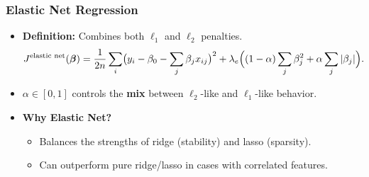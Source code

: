\documentclass[aspectratio=169]{beamer}
\begin{document}
\begin{frame}
    \frametitle{Elastic Net Regression}
    \begin{itemize}
        \item \textbf{Definition:} Combines both \(\ell_1\) and \(\ell_2\) penalties.
        \[
            J^{\text{elastic net}}(\boldsymbol{\beta}) 
            = \frac{1}{2n}\sum_i\bigl(y_i - \beta_0 - \sum_j\beta_j x_{ij}\bigr)^2 
            + \lambda_e \Bigl((1-\alpha)\sum_j \beta_j^2 + \alpha \sum_j|\beta_j|\Bigr).
        \]
        \item \(\alpha \in [0,1]\) controls the \textbf{mix} between \(\ell_2\)-like and \(\ell_1\)-like behavior.
        \item \textbf{Why Elastic Net?}
        \begin{itemize}
            \item Balances the strengths of ridge (stability) and lasso (sparsity).
            \item Can outperform pure ridge/lasso in cases with correlated features.
        \end{itemize}
    \end{itemize}
\end{frame}
\end{document}
